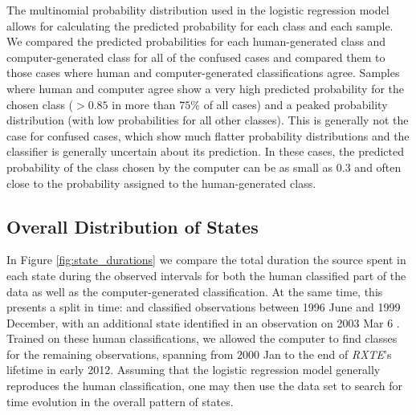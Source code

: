 \documentclass[fleqn,usenatbib]{mnras}
\newcommand{\project}[1]{\textsl{#1}}
\newcommand{\rxte}{\project{RXTE}}
\begin{document}
The multinomial probability distribution used in the logistic regression model allows for calculating the predicted probability for each class and each sample. We compared the predicted probabilities for each human-generated class and computer-generated class for all of the confused cases and compared them to those cases where human and computer-generated classifications agree. Samples where human and computer agree show a very high predicted probability for the chosen class ($>0.85$ in more than $75\%$ of all cases) and a peaked probability distribution (with low probabilities for all other classes). This is generally not the case for confused cases, which show much flatter probability distributions and the classifier is generally uncertain about its prediction. In these cases, the predicted probability of the class chosen by the computer can be as small as $0.3$ and often close to the probability assigned to the human-generated class. 

\subsection{Overall Distribution of States}

In Figure \ref{fig:state_durations} we compare the total duration the source spent in each state during the observed intervals for both the human classified part of the data as well as the computer-generated classification. At the same time, this presents a split in time: \citet{belloni2000} and \citet{kleinwolt2002} classified observations between 1996 June and 1999 December, with an additional state identified in an observation on 2003 Mar 6 \citep{hannikainen2003, hannikainen2005}. Trained on these human classifications,
we allowed the computer to find classes for the remaining observations, spanning from $2000$ Jan to the end of \rxte's lifetime in early 2012. 
Assuming that the logistic regression model generally reproduces the human classification, one may then use the data set to search for time evolution in the overall pattern of states. 
\end{document}

